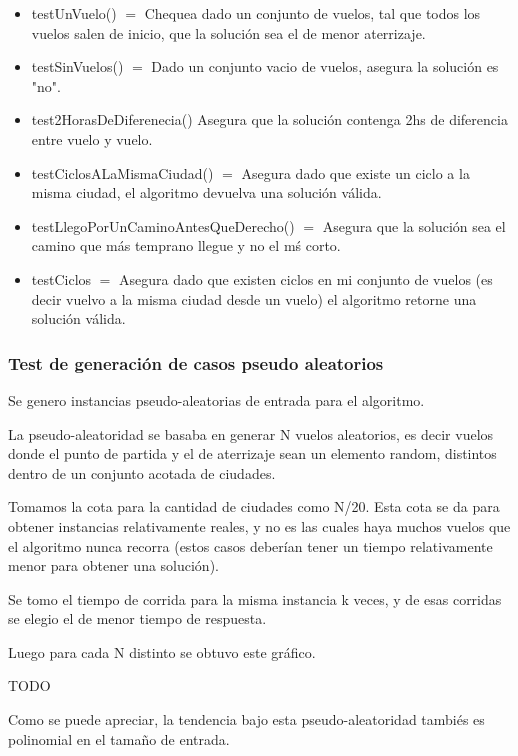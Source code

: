 \begin{itemize}
  \item testUnVuelo() $=$ Chequea dado un conjunto de vuelos, tal que todos los vuelos salen de inicio, que la soluci\'on sea el de menor aterrizaje.
  \item 	testSinVuelos() $=$ Dado un conjunto vacio de vuelos, asegura la soluci\'on es "no".
  \item test2HorasDeDiferenecia() Asegura que la soluci\'on contenga 2hs de diferencia entre vuelo y vuelo.
  \item testCiclosALaMismaCiudad() $=$ Asegura dado que existe un ciclo a la misma ciudad, el algoritmo devuelva una soluci\'on v\'alida.
  \item testLlegoPorUnCaminoAntesQueDerecho() $=$ Asegura que la soluci\'on sea el camino que m\'as temprano llegue y no el m\'s corto.
  \item testCiclos $=$ Asegura dado que existen ciclos en mi conjunto de vuelos (es decir vuelvo a la misma ciudad desde un vuelo) el algoritmo retorne una soluci\'on v\'alida.
\end{itemize}

\subsubsection{Test de generaci\'on de casos pseudo aleatorios}

Se genero instancias pseudo-aleatorias de entrada para el algoritmo.

La pseudo-aleatoridad se basaba en generar N vuelos aleatorios, es decir vuelos donde el punto de partida y el de aterrizaje sean un elemento random, distintos dentro de un conjunto acotada de ciudades.

Tomamos la cota para la cantidad de ciudades como N/20. Esta cota se da para obtener instancias relativamente reales, y no es las cuales haya muchos vuelos que el algoritmo nunca recorra (estos casos deber\'ian tener un tiempo relativamente menor para obtener una soluci\'on).


Se tomo el tiempo de corrida para la misma instancia k veces, y de esas corridas se elegio el de menor tiempo de respuesta.

Luego para cada N distinto se obtuvo este gr\'afico.

TODO

Como se puede apreciar, la tendencia bajo esta pseudo-aleatoridad tambi\'es es polinomial en el tamaño de entrada.

\newpage
